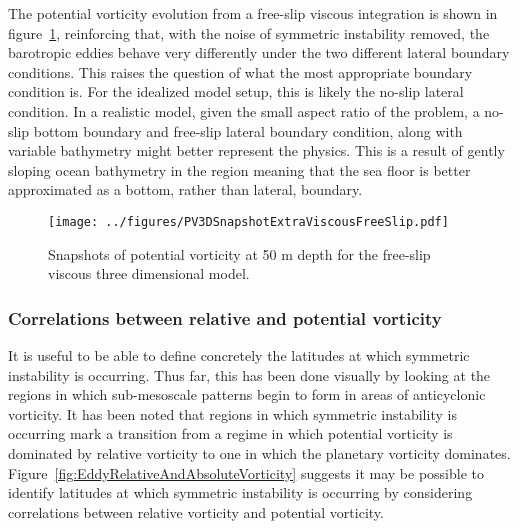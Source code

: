     The potential vorticity evolution from a free-slip viscous integration is shown in figure~\ref{fig:PV3DSnapshotViscousFreeSlip}, reinforcing that, with the noise of symmetric instability removed, the barotropic eddies behave very differently under the two different lateral boundary conditions. This raises the question of what the most appropriate boundary condition is. For the idealized model setup, this is likely the no-slip lateral condition. In a realistic model, given the small aspect ratio of the problem, a no-slip bottom boundary and free-slip lateral boundary condition, along with variable bathymetry might better represent the physics. This is a result of gently sloping ocean bathymetry in the region meaning that the sea floor is better approximated as a bottom, rather than lateral, boundary.

    \begin{figure} 
        \centering
        \texttt{[image: ../figures/PV3DSnapshotExtraViscousFreeSlip.pdf]}
        \caption{Snapshots of potential vorticity at 50 m depth for the free-slip viscous three dimensional model.}
        \label{fig:PV3DSnapshotViscousFreeSlip}
    \end{figure}

    \subsubsection{Correlations between relative and potential vorticity}
    It is useful to be able to define concretely the latitudes at which symmetric instability is occurring. Thus far, this has been done visually by looking at the regions in which sub-mesoscale patterns begin to form in areas of anticyclonic vorticity. It has been noted that regions in which symmetric instability is occurring mark a transition from a regime in which potential vorticity is dominated by relative vorticity to one in which the planetary vorticity dominates. Figure~\ref{fig:EddyRelativeAndAbsoluteVorticity} suggests it may be possible to identify latitudes at which symmetric instability is occurring by considering correlations between relative vorticity and potential vorticity.

